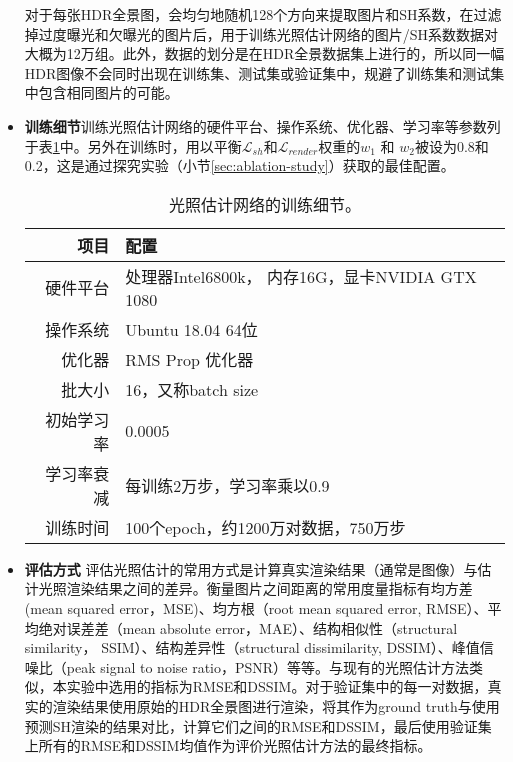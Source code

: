 \begin{itemize}
    对于每张HDR全景图，会均匀地随机128个方向来提取图片和SH系数，在过滤掉过度曝光和欠曝光的图片后，用于训练光照估计网络的图片/SH系数数据对大概为12万组。此外，数据的划分是在HDR全景数据集上进行的，所以同一幅HDR图像不会同时出现在训练集、测试集或验证集中，规避了训练集和测试集中包含相同图片的可能。
    \item \textbf{训练细节}训练光照估计网络的硬件平台、操作系统、优化器、学习率等参数列于表\ref{table:traning-details}中。另外在训练时，用以平衡$\mathcal{L}_{sh}$和$\mathcal{L}_{render}$权重的$w_1$ 和 $w_2$被设为0.8和0.2，这是通过探究实验（小节\ref{sec:ablation-study}）获取的最佳配置。
    \begin{table}[htbp]
        \centering
        \caption{
            \label{table:traning-details}
            光照估计网络的训练细节。
        }
        \begin{tabular}{r|l}
            \hline
            项目 & 配置\\
            \hline
            硬件平台 & 处理器Intel6800k， 内存16G，显卡NVIDIA GTX 1080\\
            操作系统 & Ubuntu 18.04 64位\\
            优化器    & RMS Prop 优化器\\
            批大小    & 16，又称batch size\\
            初始学习率 & 0.0005 \\
            学习率衰减 & 每训练2万步，学习率乘以0.9\\
            训练时间 & 100个epoch，约1200万对数据，750万步\\
            \hline            
        \end{tabular}
    \end{table}
    \item \textbf{评估方式} 评估光照估计的常用方式是计算真实渲染结果（通常是图像）与估计光照渲染结果之间的差异。衡量图片之间距离的常用度量指标有均方差(mean squared error，MSE)、均方根（root mean squared error, RMSE）、平均绝对误差差（mean absolute  error，MAE）、结构相似性（structural similarity， SSIM）、结构差异性（structural dissimilarity, DSSIM）、峰值信噪比（peak signal to noise ratio，PSNR）等等。与现有的光照估计方法类似，本实验中选用的指标为RMSE和DSSIM。对于验证集中的每一对数据，真实的渲染结果使用原始的HDR全景图进行渲染，将其作为ground truth与使用预测SH渲染的结果对比，计算它们之间的RMSE和DSSIM，最后使用验证集上所有的RMSE和DSSIM均值作为评价光照估计方法的最终指标。
\end{itemize}
